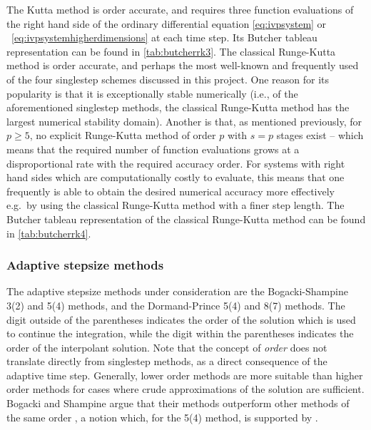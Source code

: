 



The Kutta method is  order accurate, and requires three function
evaluations of the right hand side of the ordinary differential equation
\eqref{eq:ivpsystem} or ~\eqref{eq:ivpsystemhigherdimensions} at each time
step. Its Butcher tableau representation can be found in \cref{tab:butcherrk3}.
The classical Runge-Kutta method is  order accurate, and perhaps the most
well-known and frequently used of the four singlestep schemes discussed in this
project. One reason for its popularity is that it is exceptionally stable
numerically (i.e., of the aforementioned singlestep methods, the classical
Runge-Kutta method has the largest numerical stability domain). Another is that,
as mentioned previously, for $p\geq5$, no explicit Runge-Kutta method of order
$p$ with $s=p$ stages exist
\parencite[p.173 in the 2008 printing]{hairer1993solving} -- which means that
the required number of function evaluations grows at a disproportional rate with
the required accuracy order. For systems with right hand sides which are
computationally costly to evaluate, this means that one frequently is able to
obtain the desired numerical accuracy more effectively e.g.\ by using the
classical Runge-Kutta method with a finer step length. The Butcher tableau
representation of the classical Runge-Kutta method can be found in
\cref{tab:butcherrk4}.





\subsubsection{Adaptive stepsize methods}
\label{ssub:adaptive_stepsize_methods}

The adaptive stepsize methods under consideration are the Bogacki-Shampine
3(2) and 5(4) methods, and the Dormand-Prince 5(4) and 8(7) methods. The digit
outside of the parentheses indicates the order of the solution which is used
to continue the integration, while the digit within the parentheses indicates
the order of the interpolant solution. Note that the concept of \emph{order}
does not translate directly from singlestep methods, as a direct consequence
of the adaptive time step. Generally, lower order methods are more
suitable than higher order methods for cases where crude approximations of the
solution are sufficient. Bogacki and Shampine argue that their methods
outperform other methods of the same order
\parencite{bogacki1989pair,bogacki1996efficient}, a notion which, for the 5(4)
method, is supported by
\textcite[p.194 in the 2008 printing]{hairer1993solving}.

